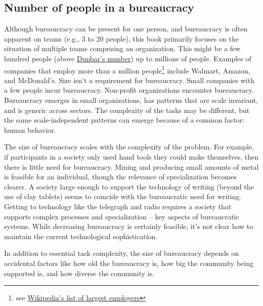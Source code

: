 \subsection{Number of people in a bureaucracy}

Although bureaucracy can be present for one person, and bureaucracy is often apparent on teams (e.g., 3 to 20 people), this book primarily focuses on the situation of multiple teams comprising an organization. This might be a few hundred people (above \href{https://en.wikipedia.org/wiki/Dunbar's_number}{Dunbar's number}) up to millions of people. 
Examples of companies that employ more than a million people\footnote{see \href{https://en.wikipedia.org/wiki/List_of_largest_employers}{Wikipedia's list of largest employers}} include Walmart, Amazon, and McDonald's. Size isn't a requirement for bureaucracy. Small companies with a few people incur bureaucracy. Non-profit organizations encounter bureaucracy. 
Bureaucracy emerges in small organizations, has patterns that are scale invariant, and is generic across sectors. The complexity of the tasks may be different, but the same scale-independent patterns can emerge because of a common factor: human behavior.

The size of bureaucracy scales with the complexity of the problem. For example, if participants in a society only used hand tools they could make themselves, then there is little need for bureaucracy. Mining and producing small amounts of metal is feasible for an individual, though the relevance of specialization becomes clearer. A society large enough to support the technology of writing (beyond the use of clay tablets) seems to coincide with the bureaucratic need for writing. Getting to technology like the telegraph and radio requires a society that supports complex processes and specialization -- key aspects of bureaucratic systems. While decreasing bureaucracy is certainly feasible, it's not clear how to maintain the current technological sophistication. 


In addition to essential task complexity, the size of bureaucracy depends on accidental factors like how old the bureaucracy is, how big the community being supported is, and how diverse the community is.


